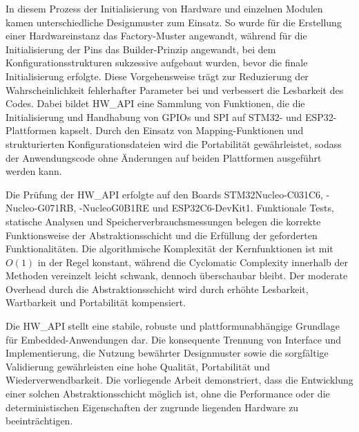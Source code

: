 In diesem Prozess der Initialisierung von Hardware und einzelnen Modulen kamen unterschiedliche Designmuster zum Einsatz.
So wurde für die Erstellung einer Hardwareinstanz das Factory-Muster angewandt, während für die Initialisierung der Pins das Builder-Prinzip angewandt, bei dem Konfigurationsstrukturen sukzessive aufgebaut wurden, bevor die finale Initialisierung erfolgte. 
Diese Vorgehensweise trägt zur Reduzierung der Wahrscheinlichkeit fehlerhafter Parameter bei und verbessert die Lesbarkeit des Codes. 
Dabei bildet HW\_API eine Sammlung von Funktionen, die die Initialisierung und Handhabung von GPIOs und SPI auf STM32- und ESP32-Plattformen kapselt. 
Durch den Einsatz von Mapping-Funktionen und strukturierten Konfigurationsdateien wird die Portabilität gewährleistet, sodass der Anwendungscode ohne Änderungen auf beiden Plattformen ausgeführt werden kann.

Die Prüfung der HW\_API erfolgte auf den Boards STM32Nucleo-C031C6, -Nucleo-G071RB, -NucleoG0B1RE und ESP32C6-DevKit1.
Funktionale Tests, statische Analysen und Speicherverbrauchsmessungen belegen die korrekte Funktionsweise der Abstraktionsschicht und die Erfüllung der geforderten Funktionalitäten. 
Die algorithmische Komplexität der Kernfunktionen ist mit $O(1)$ in der Regel konstant, während die Cyclomatic Complexity innerhalb der Methoden vereinzelt leicht schwank, dennoch überschaubar bleibt. 
Der moderate Overhead durch die Abstraktionsschicht wird durch erhöhte Lesbarkeit, Wartbarkeit und Portabilität kompensiert.

Die HW\_API stellt eine stabile, robuste und plattformunabhängige Grundlage für Embedded-Anwendungen dar. 
Die konsequente Trennung von Interface und Implementierung, die Nutzung bewährter Designmuster sowie die sorgfältige Validierung gewährleisten eine hohe Qualität, Portabilität und Wiederverwendbarkeit. 
Die vorliegende Arbeit demonstriert, dass die Entwicklung einer solchen Abstraktionsschicht möglich ist, ohne die Performance oder die deterministischen Eigenschaften der zugrunde liegenden Hardware zu beeinträchtigen.
